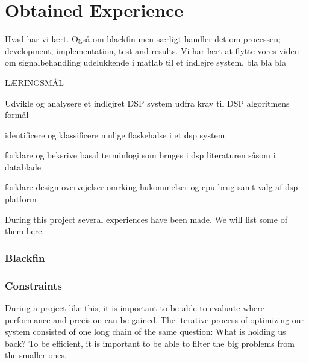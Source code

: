 \chapter{Obtained Experience}
Hvad har vi lært. Også om blackfin men særligt handler det om processen; development, implementation, test and results. Vi har lært at flytte vores viden om signalbehandling udelukkende i matlab til et indlejre system, bla bla bla

LÆRINGSMÅL

Udvikle og analysere et indlejret DSP system udfra krav til DSP algoritmens formål

identificere og klassificere mulige flaskehalse i et dsp system

forklare og beksrive basal terminlogi som bruges i dsp literaturen såsom i datablade

forklare design overvejelser omrking hukommelser og cpu brug samt valg af dsp platform

During this project several experiences have been made. We will list some of them here.

\subsection{Blackfin}

\subsection{Constraints}
During a project like this, it is important to be able to evaluate where performance and precision can be gained. The iterative process of optimizing our system consisted of one long chain of the same question: What is holding us back? To be efficient, it is important to be able to filter the big problems from the smaller ones. 


\subsection{}